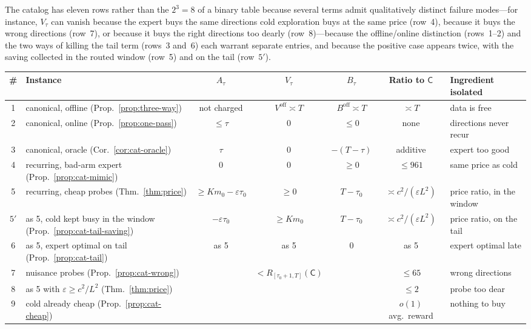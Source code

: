 \documentclass{article}
\theoremstyle{definition}
\theoremstyle{remark}
\newcommand{\eps}{\varepsilon}
\theoremstyle{remark}
\newcommand{\Cold}{\mathsf{C}}
\begin{document}
The catalog has eleven rows rather than the $2^3=8$ of a binary table
because several terms admit qualitatively distinct failure modes---for
instance, $V_\tau$ can vanish because the expert buys the same directions cold
exploration buys at the same price (row~4), because it buys the wrong
directions (row~7), or because it buys the right directions too dearly
(row~8)---because the offline/online distinction (rows~1--2) and the two
ways of killing the tail term (rows~3 and~6) each warrant separate entries,
and because the positive case appears twice, with the saving collected in
the routed window (row~5) and on the tail (row~$5'$).

\begin{table}[t]
\centering
\scriptsize
\setlength{\tabcolsep}{2.5pt}
\begin{tabular}{@{}clccccl@{}}
\toprule
\# & Instance & $A_\tau$ & $V_\tau$ & $B_\tau$ & Ratio to $\Cold$ & Ingredient isolated\\
\midrule
1 & canonical, offline (Prop.~\ref{prop:three-way}) & not charged & $V^{\mathrm{off}}\asymp T$ & $B^{\mathrm{off}}\asymp T$ & $\asymp T$ & data is free\\
2 & canonical, online (Prop.~\ref{prop:one-pass}) & $\le\tau$ & $0$ & $\le0$ & none & directions never recur\\
3 & canonical, oracle (Cor.~\ref{cor:cat-oracle}) & $\tau$ & $0$ & $-(T-\tau)$ & additive & expert too good\\
4 & recurring, bad-arm expert (Prop.~\ref{prop:cat-mimic}) & $0$ & $0$ & $\ge0$ & $\le961$ & same price as cold\\
5 & recurring, cheap probes (Thm.~\ref{thm:price}) & $\ge Km_0-\eps\tau_0$ & $\ge0$ & $T-\tau_0$ & $\asymp c^2/(\eps L^2)$ & price ratio, in the window\\
$5'$ & as 5, cold kept busy in the window (Prop.~\ref{prop:cat-tail-saving}) & $-\eps\tau_0$ & $\ge Km_0$ & $T-\tau_0$ & $\asymp c^2/(\eps L^2)$ & price ratio, on the tail\\
6 & as 5, expert optimal on tail (Prop.~\ref{prop:cat-tail}) & as 5 & as 5 & $0$ & as 5 & expert optimal late\\
7 & nuisance probes (Prop.~\ref{prop:cat-wrong}) & & $<R_{[\tau_0+1,T]}(\Cold)$ & & $\le65$ & wrong directions\\
8 & as 5 with $\eps\ge c^2/L^2$ (Thm.~\ref{thm:price}) & & & & $\le2$ & probe too dear\\
9 & cold already cheap (Prop.~\ref{prop:cat-cheap}) & & & & $o(1)$ avg.\ reward & nothing to buy\\

\end{tabular}
\end{table}
\end{document}
